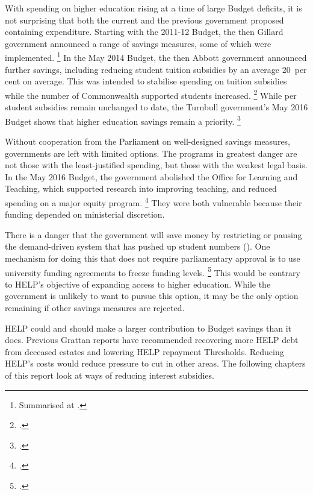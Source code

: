 \documentclass[embargoed]{grattan}
\begin{document}
With spending on higher education rising at a time of large Budget deficits, it is not surprising that both the current and the previous government proposed containing expenditure.
Starting with the 2011-12 Budget, the then Gillard government announced a range of savings measures, some of which were implemented.%
\footnote{Summarised at \textcite[][p. 12]{Warburton2016ResourcingAustraliastertiary}.} In the May 2014 Budget, the then Abbott government announced further savings, including reducing student tuition subsidies by an average 20~per cent on average.
This was intended to stabilise spending on tuition subsidies while the number of \gls{Commonwealth supported} students increased.%
\footcite[][67--69]{Education2014Portfoliobudgetstatements} 
While per student subsidies remain unchanged to date, the Turnbull government's May 2016 Budget shows that higher education savings remain a priority.%
\footcite{Education2016DrivingInnovationFairness}

Without cooperation from the Parliament on well-designed savings measures, governments are left with limited options.
The programs in greatest danger are not those with the least-justified spending, but those with the weakest legal basis.
In the May 2016 Budget, the government abolished the Office for Learning and Teaching, which supported research into improving teaching, and reduced spending on a major equity program.%
\footcite[][57]{Education2016Portfoliobudgetstatements} 
They were both vulnerable because their funding depended on ministerial discretion.

There is a danger that the government will save money by restricting or pausing the demand-driven system that has pushed up student numbers ().
One mechanism for doing this that does not require parliamentary approval is to use university funding agreements to freeze funding levels.%
\footcite[][Chapter~7]{Norton2013Keepcapsoff} 
This would be contrary to \gls{HELP}'s objective of expanding access to higher education.
While the government is unlikely to want to pursue this option, it may be the only option remaining if other savings measures are rejected.

\gls{HELP} could and should make a larger contribution to Budget savings than it does.
Previous Grattan reports have recommended recovering more \gls{HELP} debt from deceased estates and lowering \gls{HELP} repayment \gls{Threshold}s.
Reducing \gls{HELP}'s costs would reduce pressure to cut in other areas.
The following chapters of this report look at ways of reducing interest subsidies.
\end{document}
